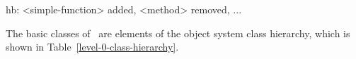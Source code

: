\label{subsec:telos}
\label{subsec:objects}
%
\begin{optPrivate}
    hb: <simple-function> added, <method> removed, ...
\end{optPrivate}
%
\begin{optDefinition}
\noindent
The basic classes of \eulisp\ are elements of the object system class hierarchy,
which is shown in Table~\ref{level-0-class-hierarchy}.
%
\begin{figure}
{\tt
{} \\
\tts{} \\
\tts{} \\
\tts{}\\
\tts{} \\
\tts\tts{} \\
\tts\tts{} \\
\tts{} \\
\tts\tts{} \\
\tts\tts\tts{} \\
\tts\tts\tts\tts{} \\
\tts\tts\tts\tts{}\\
\tts\tts\tts{} \\
\tts\tts\tts\tts{} \\
\tts\tts\tts{} \\
\tts\tts{} \\
\tts\tts\tts{} \\
\tts{} \\
\tts{} \\
\tts\tts{}\\
\tts\tts\tts{}\\
\tts\tts{}\\
\tts\tts\tts{}\\
\tts{} \\
\tts\tts{}\\
\tts\tts\tts{}\\
}
\end{figure}
\end{optDefinition}
